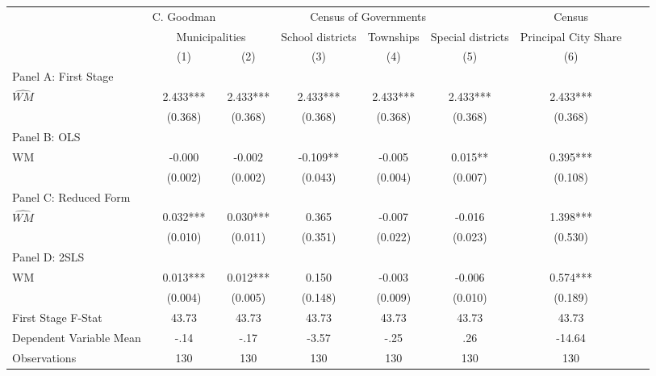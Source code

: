  \begin{tabular}{l*{8}{c}} \toprule
&\multicolumn{1}{c}{C. Goodman}&\multicolumn{4}{c}{Census of Governments}&\multicolumn{1}{c}{Census}\\\cmidrule(lr){2-2}\cmidrule(lr){3-6}\cmidrule(lr){7-7}
&\multicolumn{2}{c}{Municipalities}&\multicolumn{1}{c}{School districts}&\multicolumn{1}{c}{Townships}&\multicolumn{1}{c}{Special districts}&\multicolumn{1}{c}{Principal City Share}\\\cmidrule(lr){2-3}\cmidrule(lr){4-6}\cmidrule(lr){7-7}
&\multicolumn{1}{c}{(1)}&\multicolumn{1}{c}{(2)}&\multicolumn{1}{c}{(3)}&\multicolumn{1}{c}{(4)}&\multicolumn{1}{c}{(5)}&\multicolumn{1}{c}{(6)}\\
\cmidrule(lr){1-7}
\multicolumn{6}{l}{Panel A: First Stage}\\
\cmidrule(lr){1-7}
$\widehat{WM}$  &    2.433***&    2.433***&    2.433***&    2.433***&    2.433***&    2.433***\\
                &  (0.368)   &  (0.368)   &  (0.368)   &  (0.368)   &  (0.368)   &  (0.368)   \\
\cmidrule(lr){1-7}
\multicolumn{6}{l}{Panel B: OLS}\\
\cmidrule(lr){1-7}
WM              &   -0.000   &   -0.002   &   -0.109** &   -0.005   &    0.015** &    0.395***\\
                &  (0.002)   &  (0.002)   &  (0.043)   &  (0.004)   &  (0.007)   &  (0.108)   \\
\cmidrule(lr){1-7}
\multicolumn{6}{l}{Panel C: Reduced Form}\\
\cmidrule(lr){1-7}
$\widehat{WM}$  &    0.032***&    0.030***&    0.365   &   -0.007   &   -0.016   &    1.398***\\
                &  (0.010)   &  (0.011)   &  (0.351)   &  (0.022)   &  (0.023)   &  (0.530)   \\
\cmidrule(lr){1-7}
\multicolumn{6}{l}{Panel D: 2SLS}\\
\cmidrule(lr){1-7}
WM              &    0.013***&    0.012***&    0.150   &   -0.003   &   -0.006   &    0.574***\\
                &  (0.004)   &  (0.005)   &  (0.148)   &  (0.009)   &  (0.010)   &  (0.189)   \\
\midrule
First Stage F-Stat&    43.73   &    43.73   &    43.73   &    43.73   &    43.73   &    43.73   \\
Dependent Variable Mean&     -.14   &     -.17   &    -3.57   &     -.25   &      .26   &   -14.64   \\
Observations    &      130   &      130   &      130   &      130   &      130   &      130   \\
       \bottomrule \end{tabular}
